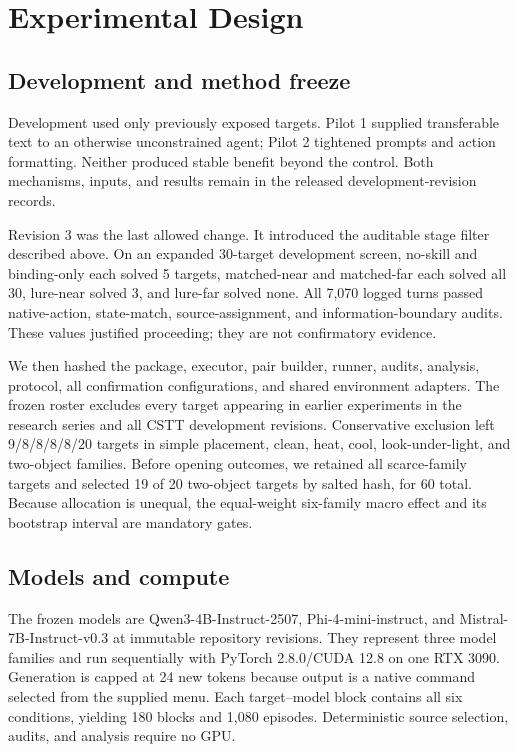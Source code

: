 \documentclass[pdflatex,sn-mathphys-num]{sn-jnl}
\begin{document}
\section{Experimental Design}
\subsection{Development and method freeze}
Development used only previously exposed targets. Pilot 1 supplied transferable
text to an otherwise unconstrained agent; Pilot 2 tightened prompts and action
formatting. Neither produced stable benefit beyond the control. Both mechanisms,
inputs, and results remain in the released development-revision records.

Revision 3 was the last allowed change. It introduced the auditable stage filter
described above. On an expanded 30-target development screen, no-skill and
binding-only each solved 5 targets, matched-near and matched-far each solved all
30, lure-near solved 3, and lure-far solved none. All 7,070 logged turns passed
native-action, state-match, source-assignment, and information-boundary audits.
These values justified proceeding; they are not confirmatory evidence.

We then hashed the package, executor, pair builder, runner, audits, analysis,
protocol, all confirmation configurations, and shared environment adapters.
The frozen roster excludes every target appearing in earlier experiments in
the research series and all CSTT development revisions. Conservative exclusion left
9/8/8/8/8/20 targets in simple placement, clean, heat, cool, look-under-light,
and two-object families. Before opening outcomes, we retained all scarce-family
targets and selected 19 of 20 two-object targets by salted hash, for 60 total.
Because allocation is unequal, the equal-weight six-family macro effect and its
bootstrap interval are mandatory gates.

\subsection{Models and compute}
The frozen models are Qwen3-4B-Instruct-2507, Phi-4-mini-instruct, and
Mistral-7B-Instruct-v0.3 at immutable repository revisions. They represent
three model families and run sequentially with PyTorch 2.8.0/CUDA 12.8 on one
RTX 3090. Generation is capped at 24 new tokens because output is a native
command selected from the supplied menu. Each target--model block contains all
six conditions, yielding 180 blocks and 1,080 episodes. Deterministic source
selection, audits, and analysis require no GPU.
\end{document}
